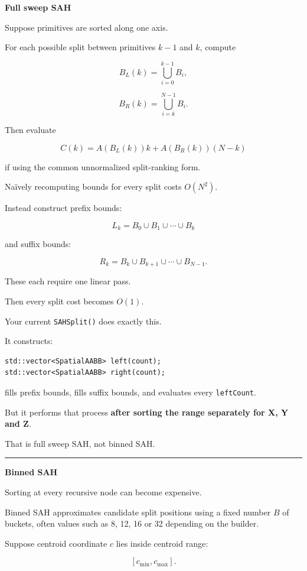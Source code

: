 \textbf{Full sweep SAH}

Suppose primitives are sorted along one axis.

For each possible split between primitives \(k-1\) and \(k\), compute

\[
B_L(k)
=
\bigcup_{i=0}^{k-1}B_i,
\]

\[
B_R(k)
=
\bigcup_{i=k}^{N-1}B_i.
\]

Then evaluate

\[
C(k)
=
A(B_L(k))k+
A(B_R(k))(N-k)
\]

if using the common unnormalized split-ranking form.

Naïvely recomputing bounds for every split costs \(O(N^2)\).

Instead construct prefix bounds:

\[
L_k=B_0\cup B_1\cup\cdots\cup B_k
\]

and suffix bounds:

\[
R_k=B_k\cup B_{k+1}\cup\cdots\cup B_{N-1}.
\]

These each require one linear pass.

Then every split cost becomes \(O(1)\).

Your current \texttt{SAHSplit()} does exactly this.

It constructs:

\begin{verbatim}
std::vector<SpatialAABB> left(count);
std::vector<SpatialAABB> right(count);
\end{verbatim}

fills prefix bounds, fills suffix bounds, and evaluates every \texttt{leftCount}.

But it performs that process \textbf{after sorting the range separately for X, Y and Z}.

That is full sweep SAH, not binned SAH.

\begin{center}\rule{0.5\linewidth}{0.5pt}\end{center}

\textbf{Binned SAH}

Sorting at every recursive node can become expensive.

Binned SAH approximates candidate split positions using a fixed number \(B\) of buckets, often values such as 8, 12, 16 or 32 depending on the builder.

Suppose centroid coordinate \(c\) lies inside centroid range:

\[
[c_{\min},c_{\max}].
\]

